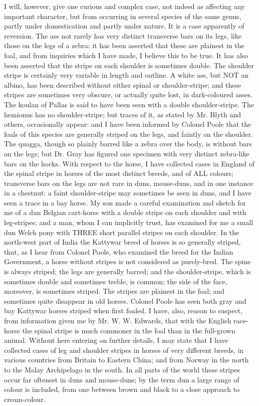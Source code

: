 I will, however, give one curious and complex case, not indeed as affecting any important character, but from occurring in several species of the same genus, partly under domestication and partly under nature. It is a case apparently of reversion. The ass not rarely has very distinct transverse bars on its legs, like those on the legs of a zebra: it has been asserted that these are plainest in the foal, and from inquiries which I have made, I believe this to be true. It has also been asserted that the stripe on each shoulder is sometimes double. The shoulder stripe is certainly very variable in length and outline. A white ass, but NOT an albino, has been described without either spinal or shoulder-stripe; and these stripes are sometimes very obscure, or actually quite lost, in dark-coloured asses. The koulan of Pallas is said to have been seen with a double shoulder-stripe. The hemionus has no shoulder-stripe; but traces of it, as stated by Mr. Blyth and others, occasionally appear: and I have been informed by Colonel Poole that the foals of this species are generally striped on the legs, and faintly on the shoulder. The quagga, though so plainly barred like a zebra over the body, is without bars on the legs; but Dr. Gray has figured one specimen with very distinct zebra-like bars on the hocks.
With respect to the horse, I have collected cases in England of the spinal stripe in horses of the most distinct breeds, and of ALL colours; transverse bars on the legs are not rare in duns, mouse-duns, and in one instance in a chestnut: a faint shoulder-stripe may sometimes be seen in duns, and I have seen a trace in a bay horse. My son made a careful examination and sketch for me of a dun Belgian cart-horse with a double stripe on each shoulder and with leg-stripes; and a man, whom I can implicitly trust, has examined for me a small dun Welch pony with THREE short parallel stripes on each shoulder.
In the north-west part of India the Kattywar breed of horses is so generally striped, that, as I hear from Colonel Poole, who examined the breed for the Indian Government, a horse without stripes is not considered as purely-bred. The spine is always striped; the legs are generally barred; and the shoulder-stripe, which is sometimes double and sometimes treble, is common; the side of the face, moreover, is sometimes striped. The stripes are plainest in the foal; and sometimes quite disappear in old horses. Colonel Poole has seen both gray and bay Kattywar horses striped when first foaled. I have, also, reason to suspect, from information given me by Mr. W. W. Edwards, that with the English race-horse the spinal stripe is much commoner in the foal than in the full-grown animal. Without here entering on further details, I may state that I have collected cases of leg and shoulder stripes in horses of very different breeds, in various countries from Britain to Eastern China; and from Norway in the north to the Malay Archipelago in the south. In all parts of the world these stripes occur far oftenest in duns and mouse-duns; by the term dun a large range of colour is included, from one between brown and black to a close approach to cream-colour.
